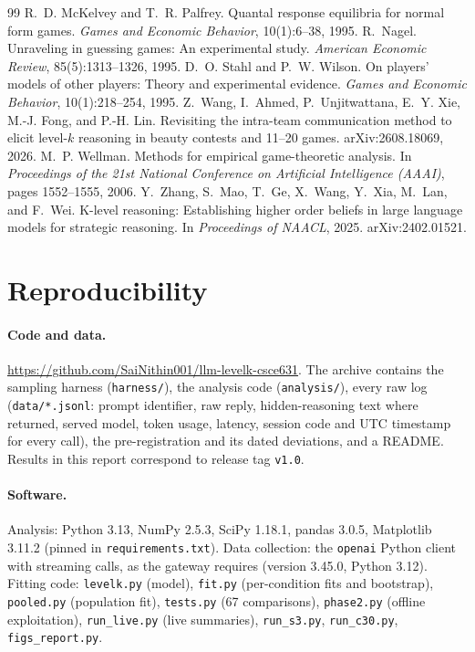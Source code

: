 \documentclass[11pt]{article}
\newcommand{\codelink}{\url{https://github.com/SaiNithin001/llm-levelk-csce631}}
\newcommand{\commitref}{release tag \texttt{v1.0}}
\newcommand{\openaiversion}{3.45.0, Python 3.12}
\begin{document}
\begin{thebibliography}{99}
 R.~D. McKelvey and T.~R. Palfrey. Quantal response equilibria for normal form games. \emph{Games and Economic Behavior}, 10(1):6--38, 1995.
 R.~Nagel. Unraveling in guessing games: An experimental study. \emph{American Economic Review}, 85(5):1313--1326, 1995.
 D.~O. Stahl and P.~W. Wilson. On players' models of other players: Theory and experimental evidence. \emph{Games and Economic Behavior}, 10(1):218--254, 1995.
 Z.~Wang, I.~Ahmed, P.~Unjitwattana, E.~Y. Xie, M.-J. Fong, and P.-H. Lin. Revisiting the intra-team communication method to elicit level-$k$ reasoning in beauty contests and 11--20 games. arXiv:2608.18069, 2026.
 M.~P. Wellman. Methods for empirical game-theoretic analysis. In \emph{Proceedings of the 21st National Conference on Artificial Intelligence (AAAI)}, pages 1552--1555, 2006.
 Y.~Zhang, S.~Mao, T.~Ge, X.~Wang, Y.~Xia, M.~Lan, and F.~Wei. K-level reasoning: Establishing higher order beliefs in large language models for strategic reasoning. In \emph{Proceedings of NAACL}, 2025. arXiv:2402.01521.
\end{thebibliography}
\endgroup

\clearpage
\appendix
\section{Reproducibility}\label{app:repro}
\paragraph{Code and data.} \codelink. The archive contains the sampling harness (\texttt{harness/}), the analysis code (\texttt{analysis/}), every raw log (\texttt{data/*.jsonl}: prompt identifier, raw reply, hidden-reasoning text where returned, served model, token usage, latency, session code and UTC timestamp for every call), the pre-registration and its dated deviations, and a README. Results in this report correspond to \commitref.

\sloppy
\paragraph{Software.} Analysis: Python 3.13, NumPy 2.5.3, SciPy 1.18.1, pandas 3.0.5, Matplotlib 3.11.2 (pinned in \texttt{requirements.txt}). Data collection: the \texttt{openai} Python client with streaming calls, as the gateway requires (version \openaiversion). Fitting code: \texttt{levelk.py} (model), \texttt{fit.py} (per-condition fits and bootstrap), \texttt{pooled.py} (population fit), \texttt{tests.py} (67 comparisons), \texttt{phase2.py} (offline exploitation), \texttt{run\_live.py} (live summaries), \texttt{run\_s3.py}, \texttt{run\_c30.py}, \texttt{figs\_report.py}.
\end{document}
